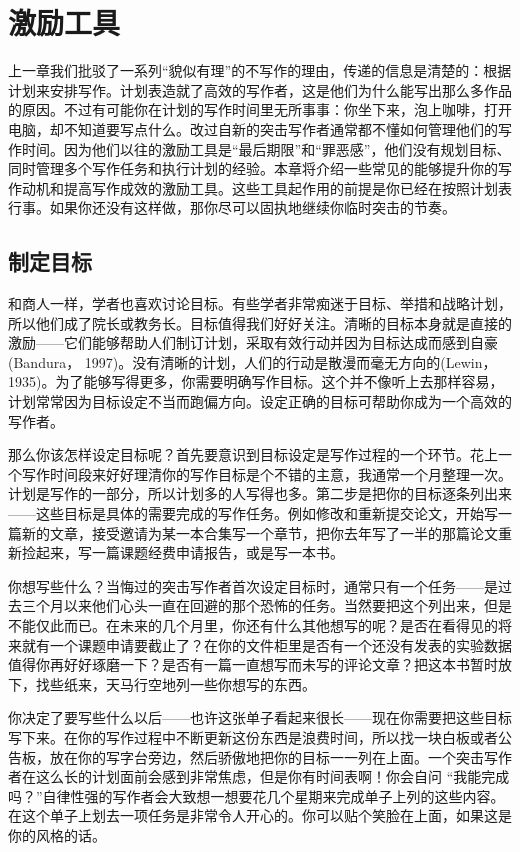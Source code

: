 \chapter{激励工具}
上一章我们批驳了一系列“貌似有理”的不写作的理由，传递的信息是清楚的：根据计划来安排写作。计划表造就了高效的写作者，这是他们为什么能写出那么多作品的原因。不过有可能你在计划的写作时间里无所事事：你坐下来，泡上咖啡，打开电脑，却不知道要写点什么。改过自新的突击写作者通常都不懂如何管理他们的写作时间。因为他们以往的激励工具是“最后期限”和“罪恶感”，他们没有规划目标、同时管理多个写作任务和执行计划的经验。本章将介绍一些常见的能够提升你的写作动机和提高写作成效的激励工具。这些工具起作用的前提是你已经在按照计划表行事。如果你还没有这样做，那你尽可以固执地继续你临时突击的节奏。

\section{制定目标}
和商人一样，学者也喜欢讨论目标。有些学者非常痴迷于目标、举措和战略计划，所以他们成了院长或教务长。目标值得我们好好关注。清晰的目标本身就是直接的激励——它们能够帮助人们制订计划，采取有效行动并因为目标达成而感到自豪(Bandura， 1997)。没有清晰的计划，人们的行动是散漫而毫无方向的(Lewin， 1935)。为了能够写得更多，你需要明确写作目标。这个并不像听上去那样容易，计划常常因为目标设定不当而跑偏方向。设定正确的目标可帮助你成为一个高效的写作者。

那么你该怎样设定目标呢？首先要意识到目标设定是写作过程的一个环节。花上一个写作时间段来好好理清你的写作目标是个不错的主意，我通常一个月整理一次。计划是写作的一部分，所以计划多的人写得也多。第二步是把你的目标逐条列出来——这些目标是具体的需要完成的写作任务。例如修改和重新提交论文，开始写一篇新的文章，接受邀请为某一本合集写一个章节，把你去年写了一半的那篇论文重新捡起来，写一篇课题经费申请报告，或是写一本书。

你想写些什么？当悔过的突击写作者首次设定目标时，通常只有一个任务——是过去三个月以来他们心头一直在回避的那个恐怖的任务。当然要把这个列出来，但是不能仅此而已。在未来的几个月里，你还有什么其他想写的呢？是否在看得见的将来就有一个课题申请要截止了？在你的文件柜里是否有一个还没有发表的实验数据值得你再好好琢磨一下？是否有一篇一直想写而未写的评论文章？把这本书暂时放下，找些纸来，天马行空地列一些你想写的东西。

你决定了要写些什么以后——也许这张单子看起来很长——现在你需要把这些目标写下来。在你的写作过程中不断更新这份东西是浪费时间，所以找一块白板或者公告板，放在你的写字台旁边，然后骄傲地把你的目标一一列在上面。一个突击写作者在这么长的计划面前会感到非常焦虑，但是你有时间表啊！你会自问 “我能完成吗？”自律性强的写作者会大致想一想要花几个星期来完成单子上列的这些内容。在这个单子上划去一项任务是非常令人开心的。你可以贴个笑脸在上面，如果这是你的风格的话。


